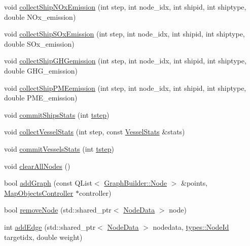 \begin{DoxyCompactItemize}
\item 
void \mbox{\hyperlink{class_displace_model_a6791beb1d51b3cd4ef9ceaf5c78b5550}{collect\+Ship\+N\+Ox\+Emission}} (int step, int node\+\_\+idx, int shipid, int shiptype, double N\+Ox\+\_\+emission)
\item 
void \mbox{\hyperlink{class_displace_model_ae28712000e4ac0657399a1bc12f1f17c}{collect\+Ship\+S\+Ox\+Emission}} (int step, int node\+\_\+idx, int shipid, int shiptype, double S\+Ox\+\_\+emission)
\item 
void \mbox{\hyperlink{class_displace_model_a17ff556c95ff39333c39b8b4b2546668}{collect\+Ship\+G\+H\+Gemission}} (int step, int node\+\_\+idx, int shipid, int shiptype, double G\+H\+G\+\_\+emission)
\item 
void \mbox{\hyperlink{class_displace_model_a546e64f50153726d6603ea4412350a81}{collect\+Ship\+P\+M\+Eemission}} (int step, int node\+\_\+idx, int shipid, int shiptype, double P\+M\+E\+\_\+emission)
\item 
void \mbox{\hyperlink{class_displace_model_aea6235feffd39564437d218431d9ad0c}{commit\+Ships\+Stats}} (int \mbox{\hyperlink{thread__vessels_8cpp_a84bc73d278de929ec9974e1a95d9b23a}{tstep}})
\item 
void \mbox{\hyperlink{class_displace_model_a6a22d489ffb35325a05d9d6b8a89e81b}{collect\+Vessel\+Stats}} (int step, const \mbox{\hyperlink{class_vessel_stats}{Vessel\+Stats}} \&stats)
\item 
void \mbox{\hyperlink{class_displace_model_a9b9b0491354b8a21ec457039c2098118}{commit\+Vessels\+Stats}} (int \mbox{\hyperlink{thread__vessels_8cpp_a84bc73d278de929ec9974e1a95d9b23a}{tstep}})
\item 
void \mbox{\hyperlink{class_displace_model_a467c933c35e6a439e50756f7db39829a}{clear\+All\+Nodes}} ()
\item 
bool \mbox{\hyperlink{class_displace_model_ab3433b80a8e7d4af4adc1db9d0223f9f}{add\+Graph}} (const Q\+List$<$ \mbox{\hyperlink{class_graph_builder_1_1_node}{Graph\+Builder\+::\+Node}} $>$ \&points, \mbox{\hyperlink{class_map_objects_controller}{Map\+Objects\+Controller}} $\ast$controller)
\item 
bool \mbox{\hyperlink{class_displace_model_afab2c55ceae81433a9d6a1f72caaf202}{remove\+Node}} (std\+::shared\+\_\+ptr$<$ \mbox{\hyperlink{class_node_data}{Node\+Data}} $>$ node)
\item 
int \mbox{\hyperlink{class_displace_model_a6afb3dffa06c671b14e46f59666abded}{add\+Edge}} (std\+::shared\+\_\+ptr$<$ \mbox{\hyperlink{class_node_data}{Node\+Data}} $>$ nodedata, \mbox{\hyperlink{classtypes_1_1_node_id}{types\+::\+Node\+Id}} targetidx, double weight)

\end{DoxyCompactItemize}
